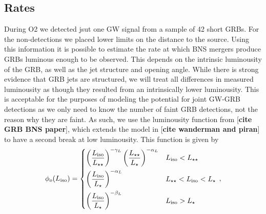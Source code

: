 \documentclass[11pt]{cuthesis}
\begin{document}
\subsection{Rates}
During O2 we detected jsut one GW signal from a sample of 42 short GRBs. For the non-detections we placed lower limits on the distance to the source. Using this information it is possible to estimate the rate at which BNS mergers produce GRBs luminous enough to be observed. This depends on the intrinsic luminousity of the GRB, as well as the jet structure and opening angle. While there is strong evidence that GRB jets are structured, we will treat all differences in measured luminousity as though they resulted from an intrinsically lower luminousity. This is acceptable for the purposes of modeling the potential for joint GW-GRB detections as we only need to know the number of faint GRB detections, not the reason why they are faint. As such, we use the luminousity function from [\textbf{cite GRB BNS paper}], which extends the model in [\textbf{cite wanderman and piran}] to have a second break at low luminousity. This function is given by
\begin{equation}
    \label{grb luminosity}
    \phi_{o}(L_\text{iso}) = 
    \begin{dcases}
          \left(\frac{L_\text{iso}}{L_{\star\star}}\right)^{-\gamma_L}\left(\frac{L_{\star\star}}{L_{\star}}\right)^{-\alpha_L} & L_\text{iso} < L_{\star\star} \\
           \left(\frac{L_\text{iso}}{L_{\star}}\right)^{-\alpha_L} & L_{\star\star} <L_\text{iso} < L_{\star} \\
            \left(\frac{L_\text{iso}}{L_{\star}}\right)^{-\beta_L} & L_\text{iso} > L_{\star} 
    \end{dcases} \, ,
\end{equation}
\end{document}

